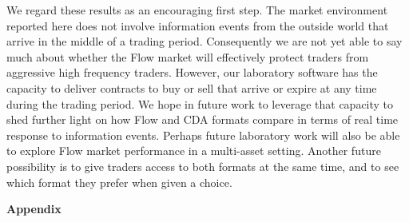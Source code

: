 \documentclass[12pt]{article}
\begin{document}
We regard these results as an encouraging first step.
The market environment reported here 
does not involve information events from the outside world that arrive 
in the middle of a trading period.
Consequently we are not yet able to say much about whether 
the Flow market will effectively protect traders from aggressive high frequency traders. 
However, our laboratory software has the capacity to deliver contracts to buy or sell that arrive or expire at any time during the trading period.
We hope in future work to leverage that capacity to shed further light on how Flow and CDA formats compare in terms of real time response to information events.
Perhaps future laboratory work will also be able to explore Flow market performance in a multi-asset setting.
Another future possibility is to give traders access to both formats at the same time, and to see which format they prefer when given a choice.










\pagebreak
\begin{singlespace}



\pagebreak
\end{singlespace}
\clearpage


\begin{singlespace}
\appendix
\setcounter{page}{1}
\begin{center}
    \huge \textbf{Appendix}
    
\end{center}




% 

\end{singlespace}
\end{document}
